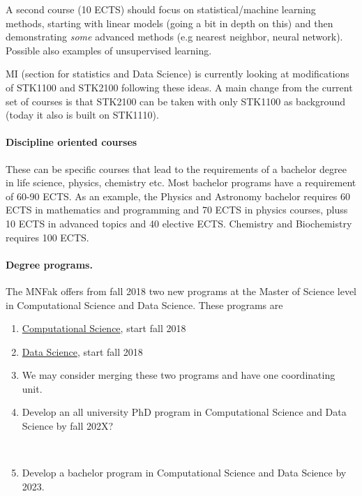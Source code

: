 \documentclass[oneside,final,10pt]{article}
\begin{document}
A second course (10 ECTS) should focus on statistical/machine learning methods, starting with linear models (going a bit in depth on this) and then demonstrating \emph{some} advanced methods (e.g nearest neighbor, neural network). Possible also examples of unsupervised learning.

MI (section for statistics and Data Science) is currently looking at modifications of STK1100 and STK2100 following these ideas. A main change from the current set of courses is that STK2100 can be taken with only STK1100 as background (today it also is built on STK1110).

\paragraph{Discipline oriented courses}

These can be specific courses that lead to the requirements of a bachelor degree in life science, physics, chemistry etc. Most bachelor programs have a requirement of 60-90 ECTS. As an example, the Physics and Astronomy bachelor requires 60 ECTS in mathematics and programming and 70 ECTS in physics courses, pluss 10 ECTS in advanced topics and 40 elective ECTS.  
Chemistry and Biochemistry requires 100 ECTS. 

\paragraph{Degree programs.}

The MNFak  offers from fall 2018 two new programs at the Master of Science level in Computational Science and Data Science. These programs are
\begin{enumerate}
\item \href{{http://www.uio.no/english/studies/programmes/computational-science-master/index.html}}{Computational Science}, start fall 2018

\item \href{{http://www.uio.no/english/studies/programmes/datascience-master/index.html}}{Data Science}, start fall 2018

\item We may consider merging these two programs and have one coordinating unit.
\item Develop an all university PhD program in Computational Science and Data Science by fall 202X?


\

\item Develop a bachelor program in Computational Science and Data Science by 2023.
\end{enumerate}
\end{document}
